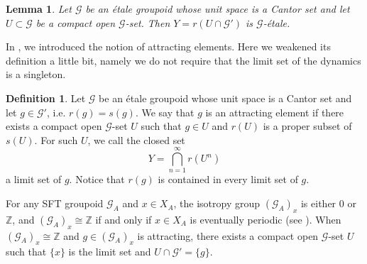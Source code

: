 \documentclass[11pt]{article}
\newtheorem{lemma}[theorem]{Lemma}
\theoremstyle{definition}
\newtheorem{definition}[theorem]{Definition}
\numberwithin{equation}{section}
\newcommand{\G}{\mathcal{G}}
\newcommand{\Z}{\mathbb{Z}}
\begin{document}
\begin{lemma}\label{Getale}
Let $\G$ be an \'etale groupoid whose unit space is a Cantor set and 
let $U\subset\G$ be a compact open $\G$-set. 
Then $Y=r(U\cap\G')$ is $\G$-\'etale. 
\end{lemma}

In \cite[Section 3]{MM14Kyoto}, 
we introduced the notion of attracting elements. 
Here we weakened its definition a little bit, 
namely we do not require that 
the limit set of the dynamics is a singleton. 

\begin{definition}\label{defofattract}
Let $\G$ be an \'etale groupoid whose unit space is a Cantor set and 
let $g\in\G'$, i.e. $r(g)=s(g)$. 
We say that $g$ is an attracting element 
if there exists a compact open $\G$-set $U$ 
such that $g\in U$ and $r(U)$ is a proper subset of $s(U)$. 
For such $U$, we call the closed set 
\[
Y=\bigcap_{n=1}^\infty r(U^n)
\]
a limit set of $g$. 
Notice that $r(g)$ is contained in every limit set of $g$. 
\end{definition}

For any SFT groupoid $\G_A$ and $x\in X_A$, 
the isotropy group $(\G_A)_x$ is either $0$ or $\Z$, 
and $(\G_A)_x\cong\Z$ if and only if $x\in X_A$ is eventually periodic 
(see \cite[Lemma 3.3]{MM14Kyoto}). 
When $(\G_A)_x\cong\Z$ and $g\in(\G_A)_x$ is attracting, 
there exists a compact open $\G$-set $U$ 
such that $\{x\}$ is the limit set and $U\cap\G'=\{g\}$. 
\end{document}

